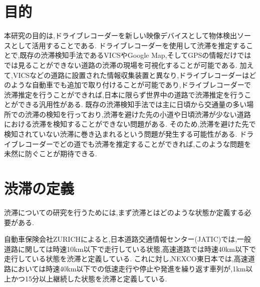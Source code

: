 \section{目的}

本研究の目的は,ドライブレコーダーを新しい映像デバイスとして物体検出ソースとして活用することである.
ドライブレコーダーを使用して渋滞を推定することで,既存の渋滞検知手法であるVICSやGoogle Map,そしてGPSの情報だけではでは見ることができない道路の渋滞の現場を可視化することが可能である.
加えて,VICSなどの道路に設置された情報収集装置と異なり,ドライブレコーダーはどのような自動車でも追加で取り付けることが可能であり,ドライブレコーダーで渋滞推定を行うことができれば,日本に限らず世界中の道路で渋滞推定を行うことができる汎用性がある.
既存の渋滞検知手法では主に日頃から交通量の多い場所での渋滞の検知を行っており,渋滞を避けた先の小道や日頃渋滞が少ない道路における渋滞を検知することができない問題がある.
そのため,渋滞を避けた先で検知されていない渋滞に巻き込まれるという問題が発生する可能性がある.
ドライブレコーダーでどの道でも渋滞を推定することができれば,このような問題を未然に防ぐことが期待できる.



\section{渋滞の定義}
渋滞についての研究を行うためには,まず渋滞とはどのような状態か定義する必要がある.

自動車保険会社ZURICHによると,日本道路交通情報センター(JATIC)では,一般道路に関しては時速10km以下で走行している状態,高速道路では時速40km以下で走行している状態を渋滞と定義している.
これに対し,NEXCO東日本では,高速道路においては時速40km以下での低速走行や停止や発進を繰り返す車列が,1km以上かつ15分以上継続した状態を渋滞と定義している\cite{zurich}.

